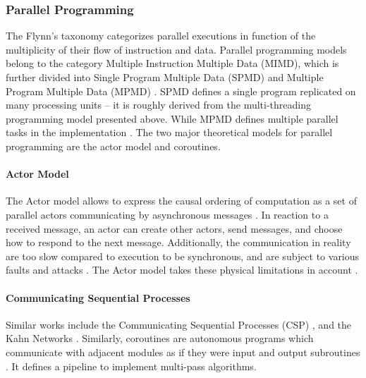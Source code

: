\subsubsection{Parallel Programming} \label{chapter3:software-efficiency:concurrency:parallel-programming}

The Flynn's taxonomy \cite{Flynn1972} categorizes parallel executions in function of the multiplicity of their flow of instruction and data.
Parallel programming models belong to the category Multiple Instruction Multiple Data (MIMD), which is further divided into Single Program Multiple Data (SPMD) \cite{Auguin1983,Darema1988,Darema2001} and Multiple Program Multiple Data (MPMD) \cite{Chang1997,Chan2004}.
SPMD defines a single program replicated on many processing units \cite{Culler,Johnson1995,K.ManiChandy2005} -- it is roughly derived from the multi-threading programming model presented above.
While MPMD defines multiple parallel tasks in the implementation \cite{Grimshaw1991,Foster1995b,Foster1996}.
The two major theoretical models for parallel programming are the actor model and coroutines.


\paragraph{Actor Model}

The Actor model allows to express the causal ordering of computation as a set of parallel actors communicating by asynchronous messages \cite{Hewitt1973a, Hewitt1977, Clinger1981}.
In reaction to a received message, an actor can create other actors, send messages, and choose how to respond to the next message.
Additionally, the communication in reality are too slow compared to execution to be synchronous, and are subject to various faults and attacks \cite{Lamport1982}.
The Actor model takes these physical limitations in account \cite{Hewitt1977a}.

\paragraph{Communicating Sequential Processes}

Similar works include the Communicating Sequential Processes (CSP) \cite{Hoare1978, Brookes1984}, and the Kahn Networks \cite{Kahn1974, Kahn1976}.
Similarly, coroutines are autonomous programs which communicate with adjacent modules as if they were input and output subroutines \cite{Conway1963}.
It defines a pipeline to implement multi-pass algorithms.

